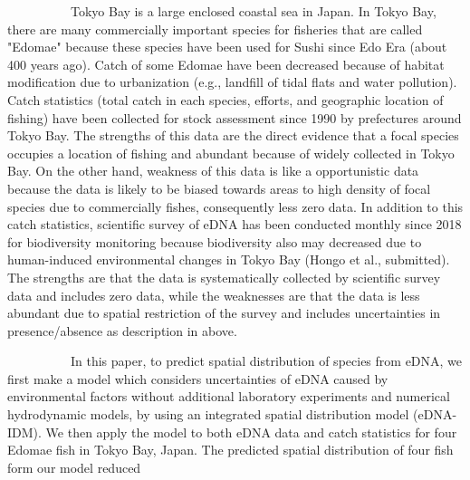 \documentclass[12pt]{article}
\begin{document}
\begin{linenumbers}
\ \ \ \ \ \ \ \ \ \ 
Tokyo Bay is a large enclosed coastal sea in Japan. In Tokyo Bay, there are many commercially important species for fisheries that are called "Edomae" because these species have been used for Sushi since Edo Era (about 400 years ago). Catch of some Edomae have been decreased because of habitat modification due to urbanization (e.g., landfill of tidal flats and water pollution). Catch statistics (total catch in each species, efforts, and geographic location of fishing) have been collected for stock assessment since 1990 by prefectures around Tokyo Bay. The strengths of this data are the direct evidence that a focal species occupies a location of fishing and abundant because of widely collected in Tokyo Bay.  On the other hand, weakness of this data is like a opportunistic data because the data is likely to be biased towards areas to high density of focal species due to commercially fishes, consequently less zero data. In addition to this catch statistics, scientific survey of eDNA has been conducted monthly since 2018 for biodiversity monitoring because biodiversity also may decreased due to human-induced environmental changes in Tokyo Bay (Hongo et al., submitted). The strengths are that the data is systematically collected by scientific survey data and includes zero data, while the weaknesses are that the data is less abundant due to spatial restriction of the survey and includes uncertainties in presence/absence as description in above.


\ \ \ \ \ \ \ \ \ \ 
In this paper, to predict spatial distribution of species from eDNA, we first make a model which considers uncertainties of eDNA caused by environmental factors without additional laboratory experiments and numerical hydrodynamic models, by using an integrated spatial distribution model (eDNA-IDM). We then apply the model to both eDNA data and catch statistics for four Edomae fish in Tokyo Bay, Japan. 
The predicted spatial distribution of four fish form our model reduced 




\end{linenumbers}
\end{document}
